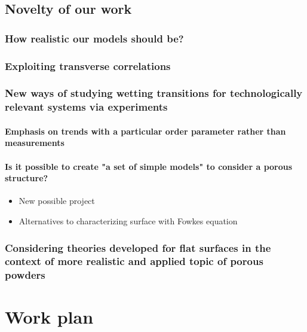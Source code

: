 \documentclass[a4paper,12pt,single,pdftex]{scrartcl}
\begin{document}
\label{ID_1979164963}\subsection{Novelty of our work}

\label{ID_1997632539}\subsubsection{How realistic our models should be?}

\label{ID_625214648}\subsubsection{Exploiting transverse correlations}

\label{ID_1607535616}\subsubsection{New ways of studying wetting transitions for technologically relevant systems via experiments}

\label{ID_825518109}\paragraph{Emphasis on trends with a particular order parameter rather than measurements}

\label{ID_1028951925}\paragraph{Is it possible to create "a set of simple models" to consider a porous structure?}

\begin{itemize}
\label{ID_1602351942}\item New possible project
\label{ID_714004449}\item Alternatives to characterizing surface with Fowkes equation
\end{itemize}
\label{ID_1602351942}\label{ID_714004449}\label{ID_30899692}\subsubsection{Considering theories developed for flat surfaces in the context of more realistic and applied topic of porous powders}

\label{ID_1615838882}\section{Work plan}
\end{document}
